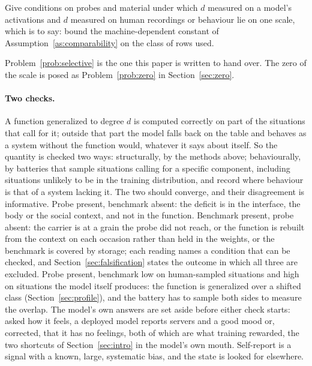 \begin{problem}
\label{prob:comparability}
Give conditions on probes and material under which $d$ measured on a model's activations and $d$
measured on human recordings or behaviour lie on one scale, which is to say: bound the
machine-dependent constant of Assumption~\ref{as:comparability} on the class of rows used.
\end{problem}

Problem~\ref{prob:selective} is the one this paper is written to hand over. The zero of the scale is
posed as Problem~\ref{prob:zero} in Section~\ref{sec:zero}.

\paragraph{Two checks.}
A function generalized to degree $d$ is computed correctly on part of the situations that call for it;
outside that part the model falls back on the table and behaves as a system without the function
would, whatever it says about itself. So the quantity is checked two ways: structurally, by the
methods above; behaviourally, by batteries that sample situations calling for a specific component,
including situations unlikely to be in the training distribution, and record where behaviour is that
of a system lacking it. The two should converge, and their disagreement is informative. Probe present,
benchmark absent: the deficit is in the interface, the body or the social context, and not in the
function. Benchmark present, probe absent: the carrier is at a grain the probe did not reach, or the
function is rebuilt from the context on each occasion rather than held in the weights, or the
benchmark is covered by storage; each reading names a condition that can be checked, and
Section~\ref{sec:falsification} states the outcome in which all three are excluded. Probe present, benchmark low on human-sampled situations and high on
situations the model itself produces: the function is generalized over a shifted class
(Section~\ref{sec:profile}), and the battery has to sample both sides to measure the overlap. The
model's own answers are set aside before either check starts: asked how it feels, a deployed model
reports servers and a good mood or, corrected, that it has no feelings, both of which are what training
rewarded, the two shortcuts of Section~\ref{sec:intro} in the model's own mouth. Self-report is a
signal with a known, large, systematic bias, and the state is looked for elsewhere.


